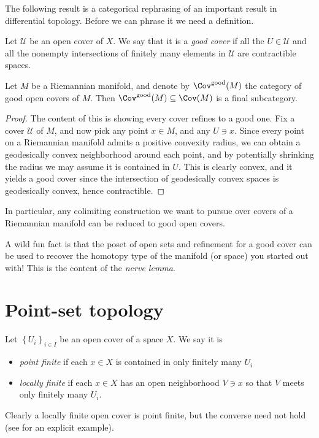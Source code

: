 \documentclass[11pt]{book}
\begin{document}
The following result is a categorical rephrasing of an important result in differential topology. Before we can phrase it we need a definition.

\begin{definition}\label{def:good-cover} Let $\mathcal{U}$ be an open cover of $X$. We say that it is a \emph{good cover} if all the $U\in \mathcal{U}$ and all the nonempty intersections of finitely many elements in $\mathcal{U}$ are contractible spaces.
\end{definition}

\begin{proposition}\label{prop:good-covers-final-in-covers-on-mfld} Let $M$ be a Riemannian manifold, and denote by $\Cov^\text{good}(M)$ the category of good open covers of $M$. Then $\Cov^\text{good}(M) \subseteq \Cov(M)$ is a final subcategory.
\end{proposition}
\begin{proof} The content of this is showing every cover refines to a good one. Fix a cover $\mathcal{U}$ of $M$, and now pick any point $x\in M$, and any $U \ni x$. Since every point on a Riemannian manifold admits a positive convexity radius, we can obtain a geodesically convex neighborhood around each point, and by potentially shrinking the radius we may assume it is contained in $U$. This is clearly convex, and it yields a good cover since the intersection of geodesically convex spaces is geodesically convex, hence contractible.
\end{proof}

In particular, any colimiting construction we want to pursue over covers of a Riemannian manifold can be reduced to good open covers.

A wild fun fact is that the poset of open sets and refinement for a good cover can be used to recover the homotopy type of the manifold (or space) you started out with! This is the content of the \emph{nerve lemma}.


\section{Point-set topology}

\begin{definition}\label{def:point-finite-versus-locally-finite} Let $\left\{ U_i \right\}_{i\in I}$ be an open cover of a space $X$. We say it is
\begin{itemize}
    \item \emph{point finite} if each $x\in X$ is contained in only finitely many $U_i$
    \item \emph{locally finite} if each $x\in X$ has an open neighborhood $V\ni x$ so that $V$ meets only finitely many $U_i$.
\end{itemize}
Clearly a locally finite open cover is point finite, but the converse need not hold (see \cite[p.~244]{Munkres} for an explicit example).
\end{definition}
\end{document}
